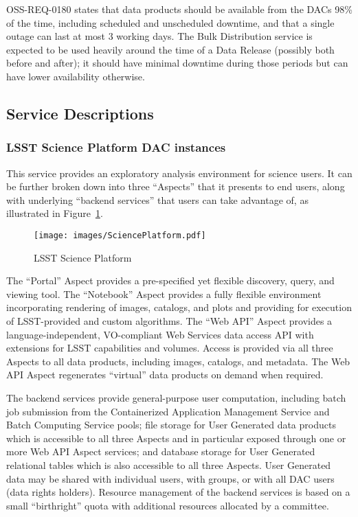 \documentclass[DM,toc,lsstdraft]{lsstdoc}
\begin{document}
OSS-REQ-0180 states that data products should be available from the DACs 98\% of the time, including scheduled and unscheduled downtime, and that a single outage can last at most 3 working days.
The Bulk Distribution service is expected to be used heavily around the time of a Data Release (possibly both before and after); it should have minimal downtime during those periods but can have lower availability otherwise.

\subsection{Service Descriptions}\label{dac-service-descriptions}

\subsubsection{LSST Science Platform DAC
instances}\label{lsst-science-platform-dac-instances}

This service provides an exploratory analysis environment for science
users. It can be further broken down into three ``Aspects'' that it
presents to end users, along with underlying ``backend services'' that
users can take advantage of, as illustrated in Figure~\ref{fig:lsp}.

\begin{figure}
\centering
\texttt{[image: images/SciencePlatform.pdf]}
\caption{LSST Science Platform}
\label{fig:lsp}
\end{figure}

The ``Portal'' Aspect provides a pre-specified yet flexible discovery,
query, and viewing tool. The ``Notebook'' Aspect provides a fully
flexible environment incorporating rendering of images,
catalogs, and plots and providing for execution of LSST-provided and
custom algorithms. The ``Web API'' Aspect provides a
language-independent, VO-compliant Web Services data access API with
extensions for LSST capabilities and volumes. Access is provided via all
three Aspects to all data products, including images, catalogs, and
metadata. The Web API Aspect regenerates ``virtual'' data products on
demand when required.

The backend services provide general-purpose user computation, including
batch job submission from the Containerized Application Management Service and Batch Computing Service pools; file storage for User Generated data products which is accessible to all three Aspects and in particular exposed through one or more Web API Aspect services; and database storage for User Generated relational tables which is also accessible to all three Aspects.
User Generated data may be shared with
individual users, with groups, or with all DAC users (data rights
holders). Resource management of the backend services is based on a
small ``birthright'' quota with additional resources allocated by a
committee.
\end{document}

